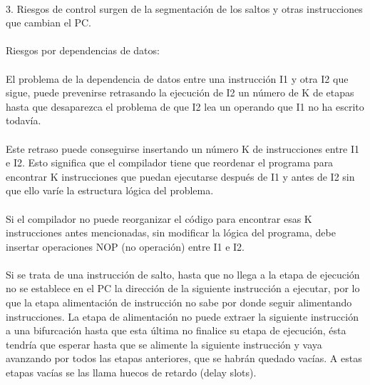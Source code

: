 \documentclass[a4paper,11pt]{article}
\begin{document}
\begin{enumerate}
\paragraph{}
3. Riesgos de control surgen de la segmentaci\'on de los saltos y otras instrucciones que cambian el PC.

\paragraph{}
Riesgos por dependencias de datos:
\paragraph{}
El problema de la dependencia de datos entre una instrucci\'on I1 y otra I2 que sigue, puede prevenirse retrasando la ejecuci\'on de I2 un n\'umero de K de etapas hasta que desaparezca el problema de que I2 lea un operando que I1 no ha escrito todav\'ia. 
\paragraph{}
Este retraso puede conseguirse insertando un n\'umero K de instrucciones entre I1 e I2. Esto significa que el compilador tiene que reordenar el programa para encontrar K instrucciones que puedan ejecutarse despu\'es de I1 y antes de I2 sin que ello var\'ie la estructura l\'ogica del problema.
\paragraph{}
Si el compilador no puede reorganizar el c\'odigo para encontrar esas K instrucciones antes mencionadas, sin modificar la l\'ogica del programa, debe insertar operaciones NOP (no operaci\'on) entre I1 e I2.

\paragraph{}
Si se trata de una instrucci\'on de salto, hasta que no llega a la etapa de ejecuci\'on no se establece en el PC la direcci\'on de la siguiente instrucci\'on a ejecutar, por lo que la etapa alimentaci\'on de instrucci\'on no sabe por donde seguir alimentando instrucciones. La etapa de alimentaci\'on no puede extraer la siguiente instrucci\'on a una bifurcaci\'on hasta que esta \'ultima no finalice su etapa de ejecuci\'on, \'esta tendr\'ia que esperar hasta que se alimente la siguiente instrucci\'on y vaya avanzando por todos las etapas anteriores, que se habr\'an quedado vac\'ias. A estas etapas vac\'ias se las llama huecos de retardo (delay slots).

\end{enumerate}
\end{document}
